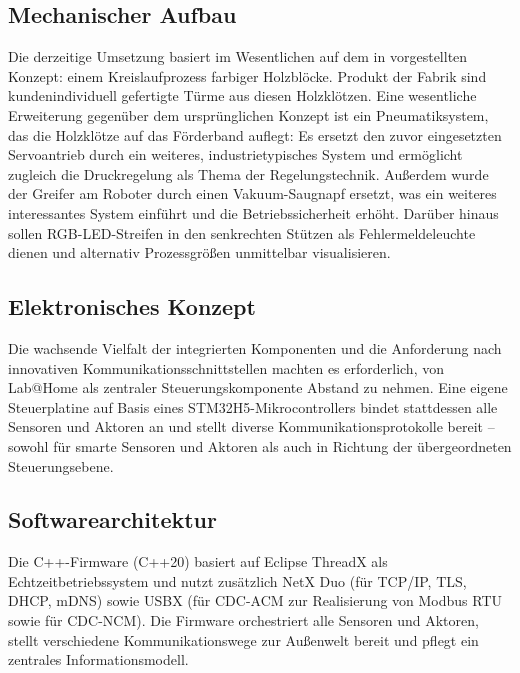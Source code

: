 \documentclass[]{article}%
\begin{document}
\subsection{Mechanischer Aufbau}
Die derzeitige Umsetzung basiert im Wesentlichen auf dem in \cite{liebler2025} vorgestellten Konzept: einem Kreislaufprozess farbiger Holzblöcke. Produkt der Fabrik sind kundenindividuell gefertigte Türme aus diesen Holzklötzen. Eine wesentliche Erweiterung gegenüber dem ursprünglichen Konzept ist ein Pneumatiksystem, das die Holzklötze auf das Förderband auflegt: Es ersetzt den zuvor eingesetzten Servoantrieb durch ein weiteres, industrietypisches System und ermöglicht zugleich die Druckregelung als Thema der Regelungstechnik. Außerdem wurde der Greifer am Roboter durch einen Vakuum-Saugnapf ersetzt, was ein weiteres interessantes System einführt und die Betriebssicherheit erhöht. Darüber hinaus sollen RGB-LED-Streifen in den senkrechten Stützen als Fehlermeldeleuchte dienen und alternativ Prozessgrößen unmittelbar visualisieren.

\subsection{Elektronisches Konzept}
Die wachsende Vielfalt der integrierten Komponenten und die Anforderung nach innovativen Kommunikationsschnittstellen machten es erforderlich, von Lab@Home als zentraler Steuerungskomponente Abstand zu nehmen. Eine eigene Steuerplatine auf Basis eines STM32H5-Mikrocontrollers bindet stattdessen alle Sensoren und Aktoren an und stellt diverse Kommunikationsprotokolle bereit -- sowohl für smarte Sensoren und Aktoren als auch in Richtung der übergeordneten Steuerungsebene.

\subsection{Softwarearchitektur}
Die C++-Firmware (C++20) basiert auf Eclipse ThreadX \cite{threadx} als Echtzeitbetriebssystem und nutzt zusätzlich NetX Duo (für TCP/IP, TLS, DHCP, mDNS) sowie USBX (für CDC-ACM zur Realisierung von Modbus RTU sowie für CDC-NCM). Die Firmware orchestriert alle Sensoren und Aktoren, stellt verschiedene Kommunikationswege zur Außenwelt bereit und pflegt ein zentrales Informationsmodell.
\end{document}
